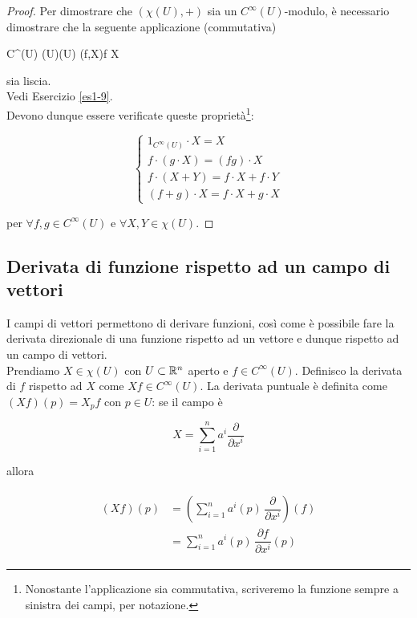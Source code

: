 \begin{proof}
	Per dimostrare che $ (\chi(U),+) $ sia un $ C^{\infty}(U) $-modulo, è necessario dimostrare che la seguente applicazione (commutativa)
	
		{C^{\infty}(U) \times \chi(U)}{\chi(U)}%
		{(f,X)}{f X}

	sia liscia.\\
	Vedi Esercizio \ref{es1-9}.\\
	Devono dunque essere verificate queste proprietà\footnote{%
		Nonostante l'applicazione sia commutativa, scriveremo la funzione sempre a sinistra dei campi, per notazione.%
	}:

	\begin{equation}
		\begin{cases}
			1_{C^{\infty}(U)} \cdot X = X\\
			f \cdot (g \cdot X) = (f g) \cdot X\\
			f \cdot (X+Y) = f \cdot X + f \cdot Y\\
			(f+g) \cdot X = f \cdot X + g \cdot X
		\end{cases}
	\end{equation}

	per $ \forall f,g \in C^{\infty}(U) $ e $ \forall X,Y \in \chi(U) $.
\end{proof}

\subsection{Derivata di funzione rispetto ad un campo di vettori} 

I campi di vettori permettono di derivare funzioni, così come è possibile fare la derivata direzionale di una funzione rispetto ad un vettore e dunque rispetto ad un campo di vettori.\\
Prendiamo $ X \in \chi(U) $ con $ U \subset \mathbb{R}^{n} $ aperto e $ f \in C^{\infty}(U) $. Definisco la derivata di $ f $ rispetto ad $ X $ come $ X f \in C^{\infty}(U) $. La derivata puntuale è definita come $ (X f) (p) = X_{p} f $ con $ p \in U $: se il campo è

\begin{equation}
	X = \sum_{i=1}^{n} a^{i} \dfrac{\partial}{\partial x^{i}}
\end{equation}

allora

\begin{align}
	\begin{split}
		(X f) (p) &= \left( \sum_{i=1}^{n} a^{i}(p) \, \dfrac{\partial}{\partial x^{i}} \right) (f)\\
		&= \sum_{i=1}^{n} a^{i}(p) \, \dfrac{\partial f}{\partial x^{i}} (p)
	\end{split}
\end{align}

